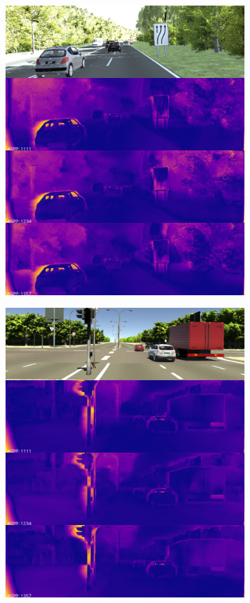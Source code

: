 \begin{figure}[h!]
\begin{subfigure}[c]{0.24\textwidth}
\includegraphics[width=\textwidth]{images/visual_comparisons/aspp-rates-vkitti/concat_1226.png}
\end{subfigure}
\begin{subfigure}[c]{0.24\textwidth}
\includegraphics[width=\textwidth]{images/visual_comparisons/aspp-rates-vkitti/concat_763.png}

\end{subfigure}
\end{figure}
